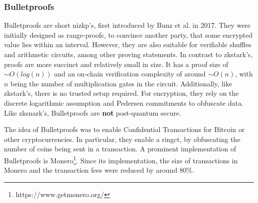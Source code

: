 \subsubsection{Bulletproofs}
\label{subsubsec:bulletproofs}

Bulletproofs are short \acrshort{nizkp}'s, first introduced by Bunz et al. \cite{bunzBulletproofsShortProofs2018} in 2017. They were initially designed as range-proofs, to convince another party, that some encrypted value lies within an interval. However, they are also suitable for verifiable shuffles and arithmetic circuits, among other proving statements. In contrast to \acrshort{zkstark}'s, proofs are more succinct and relatively small in size. It has a proof size of $\sim O(log(n))$ and an on-chain verification complexity of around $\sim O(n)$, with $n$ being the number of multiplication gates in the circuit. Additionally, like \acrshort{zkstark}'s, there is no trusted setup required. For encryption, they rely on the discrete logarithmic assumption and Pedersen commitments to obfuscate data. Like \acrshort{zksnark}'s, Bulletproofs are \textbf{not} post-quantum secure.

The idea of Bulletproofs was to enable Confidential Transactions for Bitcoin or other cryptocurrencies. In particular, they enable a \acrfull{ringct}, by obfuscating the number of coins being sent in a transaction. A prominent implementation of Bulletproofs is Monero\footnote{https://www.getmonero.org/}. Since its implementation, the size of transactions in Monero and the transaction fees were reduced by around 80\%.
